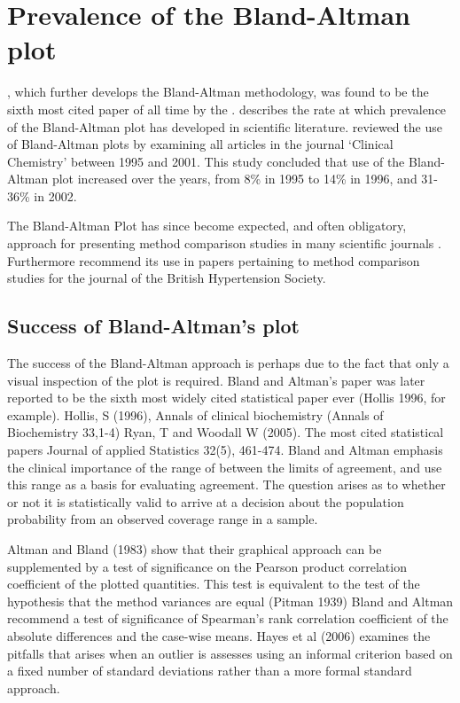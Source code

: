\documentclass[MAIN.tex]{subfiles}
\begin{document}
\section{Prevalence of the Bland-Altman plot}

\citet*{BA86}, which further develops the Bland-Altman methodology,
was found to be the sixth most cited paper of all time by the
\citet{BAcite}. \cite{Dewitte} describes the rate at which
prevalence of the Bland-Altman plot has developed in scientific
literature. \citet{Dewitte} reviewed the use of Bland-Altman plots
by examining all articles in the journal `Clinical Chemistry'
between 1995 and 2001. This study concluded that use of the
Bland-Altman plot increased over the years, from 8\% in 1995 to
14\% in 1996, and 31-36\% in 2002.

The Bland-Altman Plot has since become expected, and
often obligatory, approach for presenting method comparison
studies in many scientific journals \citep{hollis}. Furthermore
\citet{BritHypSoc} recommend its use in papers pertaining to
method comparison studies for the journal of the British
Hypertension Society.

\subsection{Success of Bland-Altman’s plot}
The success of the Bland-Altman approach is perhaps due to the fact that only a visual inspection of the plot is required. Bland and Altman’s paper was later reported to be the sixth most widely cited statistical paper ever (Hollis 1996, for example).
Hollis, S (1996), Annals of clinical biochemistry (Annals of Biochemistry 33,1-4)
Ryan, T and Woodall W (2005). The most cited statistical papers Journal of applied Statistics 32(5), 461-474.
Bland and Altman emphasis the clinical importance of the range of between the limits of agreement, and use this range as a basis for evaluating agreement.
The question arises as to whether  or not it is statistically valid to arrive at a decision about the population probability from an observed coverage range in a sample.

Altman and Bland (1983) show that their graphical approach can be supplemented by a test of significance on the Pearson product correlation coefficient of the plotted quantities. This test is equivalent to the test of the hypothesis that the method variances are equal (Pitman 1939)
Bland and Altman recommend a test of significance of Spearman’s rank correlation coefficient of the absolute differences and the case-wise means.
Hayes et al (2006) examines the pitfalls that arises when an outlier is assesses using an informal criterion based on a fixed number of standard deviations rather than a more formal standard approach.
\end{document}
